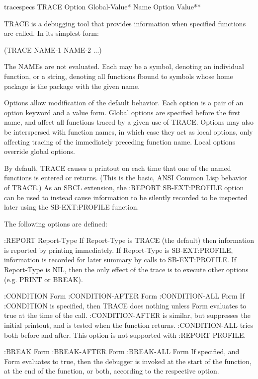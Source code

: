 \documentclass[10pt,english]{book}
\begin{document}
\begin{macro}{trace}{\rest specs}
  TRACE {Option Global-Value}* {Name {Option Value}*}*

TRACE is a debugging tool that provides information when specified
functions are called. In its simplest form:

       (TRACE NAME-1 NAME-2 ...)

The NAMEs are not evaluated. Each may be a symbol, denoting an
individual function, or a string, denoting all functions fbound to
symbols whose home package is the package with the given name.

Options allow modification of the default behavior. Each option is a
pair of an option keyword and a value form. Global options are
specified before the first name, and affect all functions traced by a
given use of TRACE. Options may also be interspersed with function
names, in which case they act as local options, only affecting tracing
of the immediately preceding function name. Local options override
global options.

By default, TRACE causes a printout on  each time
that one of the named functions is entered or returns. (This is the
basic, ANSI Common Lisp behavior of TRACE.) As an SBCL extension, the
:REPORT SB-EXT:PROFILE option can be used to instead cause information
to be silently recorded to be inspected later using the SB-EXT:PROFILE
function.

The following options are defined:

   :REPORT Report-Type
       If Report-Type is TRACE (the default) then information is reported
       by printing immediately. If Report-Type is SB-EXT:PROFILE, information
       is recorded for later summary by calls to SB-EXT:PROFILE. If
       Report-Type is NIL, then the only effect of the trace is to execute
       other options (e.g. PRINT or BREAK).

   :CONDITION Form
   :CONDITION-AFTER Form
   :CONDITION-ALL Form
       If :CONDITION is specified, then TRACE does nothing unless Form
       evaluates to true at the time of the call. :CONDITION-AFTER is
       similar, but suppresses the initial printout, and is tested when the
       function returns. :CONDITION-ALL tries both before and after.
       This option is not supported with :REPORT PROFILE.

   :BREAK Form
   :BREAK-AFTER Form
   :BREAK-ALL Form
       If specified, and Form evaluates to true, then the debugger is invoked
       at the start of the function, at the end of the function, or both,
       according to the respective option.


\end{macro}
\end{document}
